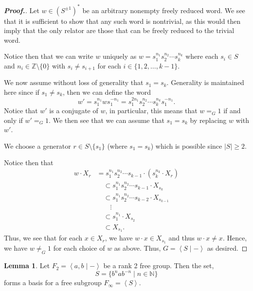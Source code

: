 \documentclass[11pt,a4paper,reqno]{amsart}
\theoremstyle{plain}
\theoremstyle{definition}
\newtheorem{lemma}[theorem]{Lemma}
\theoremstyle{definition}
\renewcommand\geq\geqslant
\newenvironment{myproof}{\begin{proof}[\normalfont\bfseries Proof.]}{\end{proof}}
\begin{document}
\begin{myproof}
	Let $w \in (S^{\pm 1})^*$ be an arbitrary nonempty freely reduced word.
	We see that it is sufficient to show that any such word is nontrivial, as this would then imply that the only relator are those that can be freely reduced to the trivial word.

	Notice then that we can write $w$ uniquely as $w = s_1^{n_1} s_2^{n_2} \cdots s_k^{n_k}$ where each $s_i \in S$ and $n_i \in \mathbb Z\setminus \{0\}$ with $s_i \neq s_{i+1}$ for each $i\in \{1,2,\ldots,k-1\}$.

	We now assume without loss of generality that $s_1 = s_k$.
	Generality is maintained here since if $s_1\neq s_k$, then we can define the word
	\[
		w' = s_1^{n_1} w s_1^{-n_1}
		=s_1^{2n_1} s_2^{n_2} \cdots s_k^{n_k} s_1^{-n_1}.
	\]
	Notice that $w'$ is a conjugate of $w$, in particular, this means that $w=_G 1$ if and only if $w'=_G 1$.
	We then see that we can assume that $s_1=s_k$ by replacing $w$ with $w'$.

	We choose a generator $r \in S\setminus\{s_1\}$ (where $s_1=s_k$) which is possible since $|S| \geq 2$.

	Notice then that
	\begin{align*}
		w\cdot X_r & = s_1^{n_1} s_2^{n_2} \cdots s_{k-1}\cdot(s_k^{n_k} \cdot X_r)
		\\&\quad \subset s_1^{n_1} s_2^{n_2} \cdots s_{k-1} \cdot X_{s_k}
		\\&\quad \subset s_1^{n_1} s_2^{n_2} \cdots s_{k-2} \cdot X_{s_{k-1}}
		\\& \qquad\vdots
		\\&\quad \subset s_1^{n_1} \cdot X_{s_2}
		\\&\quad \subset X_{s_1}.
	\end{align*}
	Thus, we see that for each $x\in X_r$, we have $w\cdot x \in X_{s_1}$ and thus $w\cdot x \neq x$.
	Hence, we have $w\neq_G 1$ for each choice of $w$ as above. Thus, $G = \left\langle S \mid - \right\rangle$ as desired.
\end{myproof}

\begin{lemma}\label{lem:free-groups}
	Let $F_2 = \left\langle a,b \mid - \right\rangle$ be a rank 2 free group.
	Then the set,
	\[
		S
		=
		\{
		b^n a b^{-n} \mid n\in \mathbb N
		\}
	\]
	forms a basis for a free subgroup $F_\infty = \left\langle S \right\rangle$.
\end{lemma}
\end{document}
